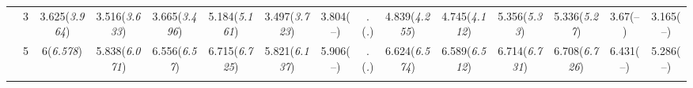 \documentclass{article}
\begin{document}
\begin{table}[tbp]
{\begin{tabularx}{\textwidth}{lCCCCCCCCCCCCCC}
&3&3.625\newline (\emph{3.964})&3.516\newline (\emph{3.633})&3.665\newline (\emph{3.496})&5.184\newline (\emph{5.161})&3.497\newline (\emph{3.723})&3.804\newline (--)&.\newline (\emph{.})&4.839\newline (\emph{4.255})&4.745\newline (\emph{4.112})&5.356\newline (\emph{5.33})&5.336\newline (\emph{5.27})&3.67\newline (--)&3.165\newline (--) \tabularnewline
&5&6\newline (\emph{6.578})&5.838\newline (\emph{6.071})&6.556\newline (\emph{6.57})&6.715\newline (\emph{6.725})&5.821\newline (\emph{6.137})&5.906\newline (--)&.\newline (\emph{.})&6.624\newline (\emph{6.574})&6.589\newline (\emph{6.512})&6.714\newline (\emph{6.731})&6.708\newline (\emph{6.726})&6.431\newline (--)&5.286\newline (--) \tabularnewline
\bottomrule \addlinespace[1.5ex]

\end{tabularx}
}
\end{table}
\end{document}
